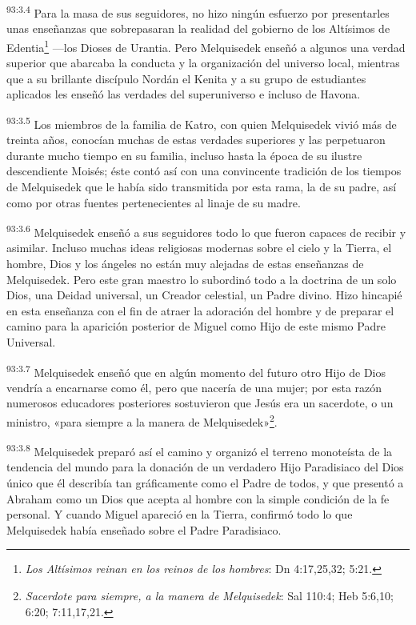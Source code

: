 \par
\textsuperscript{93:3.4} Para la masa de sus seguidores, no hizo ningún esfuerzo por presentarles unas enseñanzas que sobrepasaran la realidad del gobierno de los Altísimos de Edentia\footnote{\textit{Los Altísimos reinan en los reinos de los hombres}: Dn 4:17,25,32; 5:21.} ---los Dioses de Urantia. Pero Melquisedek enseñó a algunos una verdad superior que abarcaba la conducta y la organización del universo local, mientras que a su brillante discípulo Nordán el Kenita y a su grupo de estudiantes aplicados les enseñó las verdades del superuniverso e incluso de Havona.

\par
\textsuperscript{93:3.5} Los miembros de la familia de Katro, con quien Melquisedek vivió más de treinta años, conocían muchas de estas verdades superiores y las perpetuaron durante mucho tiempo en su familia, incluso hasta la época de su ilustre descendiente Moisés; éste contó así con una convincente tradición de los tiempos de Melquisedek que le había sido transmitida por esta rama, la de su padre, así como por otras fuentes pertenecientes al linaje de su madre.

\par
\textsuperscript{93:3.6} Melquisedek enseñó a sus seguidores todo lo que fueron capaces de recibir y asimilar. Incluso muchas ideas religiosas modernas sobre el cielo y la Tierra, el hombre, Dios y los ángeles no están muy alejadas de estas enseñanzas de Melquisedek. Pero este gran maestro lo subordinó todo a la doctrina de un solo Dios, una Deidad universal, un Creador celestial, un Padre divino. Hizo hincapié en esta enseñanza con el fin de atraer la adoración del hombre y de preparar el camino para la aparición posterior de Miguel como Hijo de este mismo Padre Universal.

\par
\textsuperscript{93:3.7} Melquisedek enseñó que en algún momento del futuro otro Hijo de Dios vendría a encarnarse como él, pero que nacería de una mujer; por esta razón numerosos educadores posteriores sostuvieron que Jesús era un sacerdote, o un ministro, «para siempre a la manera de Melquisedek»\footnote{\textit{Sacerdote para siempre, a la manera de Melquisedek}: Sal 110:4; Heb 5:6,10; 6:20; 7:11,17,21.}.

\par
\textsuperscript{93:3.8} Melquisedek preparó así el camino y organizó el terreno monoteísta de la tendencia del mundo para la donación de un verdadero Hijo Paradisiaco del Dios único que él describía tan gráficamente como el Padre de todos, y que presentó a Abraham como un Dios que acepta al hombre con la simple condición de la fe personal. Y cuando Miguel apareció en la Tierra, confirmó todo lo que Melquisedek había enseñado sobre el Padre Paradisiaco.

